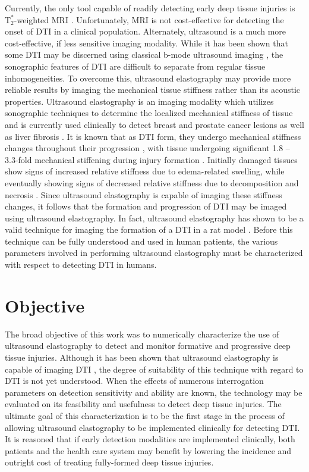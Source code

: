 		Currently, the only tool capable of readily detecting early deep tissue injuries is $\mathrm{T}_2^*$-weighted MRI \cite{stekelenburg06,loerakker11}. Unfortunately, MRI is not cost-effective for detecting the onset of DTI in a clinical population. Alternately, ultrasound is a much more cost-effective, if less sensitive imaging modality. While it has been shown that some DTI may be discerned using classical b-mode ultrasound imaging \cite{aoi08, kanno09}, the sonographic features of DTI are difficult to separate from regular tissue inhomogeneities. To overcome this, ultrasound elastography may provide more reliable results by imaging the mechanical tissue stiffness rather than its acoustic properties. Ultrasound elastography is an imaging modality which utilizes sonographic techniques to determine the localized mechanical stiffness of tissue and is currently used clinically to detect breast and prostate cancer lesions \cite{tanter08, konig05} as well as liver fibrosis \cite{sandrin03}. It is known that as DTI form, they undergo mechanical stiffness changes throughout their progression \cite{linderganz04,oomens10,solis12-03}, with tissue undergoing significant 1.8 -- 3.3-fold mechanical stiffening during injury formation \cite{gefen05}. Initially damaged tissues show signs of increased relative stiffness due to edema-related swelling, while eventually showing signs of decreased relative stiffness due to decomposition and necrosis \cite{gefen09}. Since ultrasound elastography is capable of imaging these stiffness changes, it follows that the formation and progression of DTI may be imaged using ultrasound elastography. In fact, ultrasound elastography has shown to be a valid technique for imaging the formation of a DTI in a rat model \cite{deprez11}. Before this technique can be fully understood and used in human patients, the various parameters involved in performing ultrasound elastography must be characterized with respect to detecting DTI in humans.

	\section{Objective}
		The broad objective of this work was to numerically characterize the use of ultrasound elastography to detect and monitor formative and progressive deep tissue injuries. Although it has been shown that ultrasound elastography is capable of imaging DTI \cite{deprez11}, the degree of suitability of this technique with regard to DTI is not yet understood. When the effects of numerous interrogation parameters on detection sensitivity and ability are known, the technology may be evaluated on its feasibility and usefulness to detect deep tissue injuries. The ultimate goal of this characterization is to be the first stage in the process of allowing ultrasound elastography to be implemented clinically for detecting DTI. It is reasoned that if early detection modalities are implemented clinically, both patients and the health care system may benefit by lowering the incidence and outright cost of treating fully-formed deep tissue injuries.

